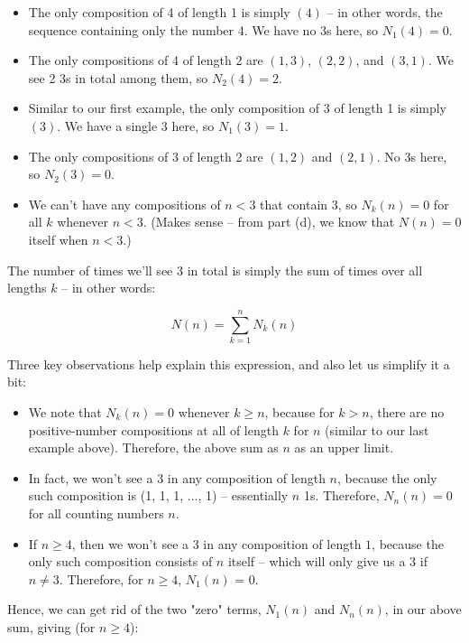 \begin{itemize}
\item The only composition of 4 of length 1 is simply $(4)$ -- in other words, the sequence containing only the number 4. We have no 3s here, so $N_1(4) = 0$.
\item The only compositions of 4 of length 2 are $(1,3)$, $(2,2)$, and $(3,1)$. We see 2 3s in total among them, so $N_2(4) = 2$.
\item Similar to our first example, the only composition of 3 of length 1 is simply $(3)$. We have a single 3 here, so $N_1(3) = 1$.
\item The only compositions of 3 of length 2 are $(1,2)$ and $(2,1)$. No 3s here, so $N_2(3) = 0$.
\item We can't have any compositions of $n < 3$ that contain 3, so $N_k(n) = 0$ for all $k$ whenever $n < 3$. (Makes sense -- from part (d), we know that $N(n) = 0$ itself when $n < 3$.)
\end{itemize}


The number of times we'll see 3 in total is simply the sum of times over all lengths $k$ -- in other words:

\begin{equation*}
N(n) = \sum_{k=1}^{n} N_k(n)
\end{equation*}

Three key observations help explain this expression, and also let us simplify it a bit:

\begin{itemize}
\item We note that $N_k(n) = 0$ whenever $k \geq n$, because for $k > n$, there are no positive-number compositions at all of length $k$ for $n$ (similar to our last example above). Therefore, the above sum as $n$ as an upper limit. 
\item In fact, we won't see a 3 in any composition of length $n$, because the only such composition is (1, 1, 1, ..., 1) -- essentially $n$ 1s. Therefore, $N_n(n) = 0$ for all counting numbers $n$.
\item If $n \geq 4$, then we won't see a 3 in any composition of length $1$, because the only such composition consists of $n$ itself -- which will only give us a 3 if $n \neq 3$. Therefore, for $n \geq 4$, $N_1(n)$ = 0. 
\end{itemize}

Hence, we can get rid of the two "zero" terms, $N_1(n)$ and $N_n(n)$, in our above sum, giving (for $n \geq 4$):

